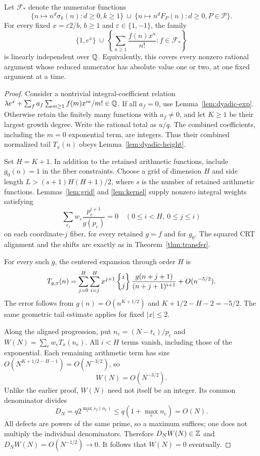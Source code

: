 \begin{theorem}
\label{thm:dyadic}
Let $\mathcal F_*$ denote the numerator functions
\[
 \{n\mapsto n^d\sigma_k(n):d\geq0,k\geq1\}
 \ \cup\
 \{n\mapsto n^dF_P(n):d\geq0,P\in\mathcal P\}.
\]
For every fixed $x=\varepsilon 2/b$, $b\geq1$ and
$\varepsilon\in\{1,-1\}$, the family
\[
 \{1,e^x\}\ \cup\
 \left\{\sum_{n\geq1}\frac{f(n)x^n}{n!}:f\in\mathcal F_*\right\}
\]
is linearly independent over $\mathbb Q$.
Equivalently, this covers every nonzero rational argument whose
reduced numerator has absolute value one or two, at one fixed
argument at a time.
\end{theorem}
\begin{proof}
Consider a nontrivial integral-coefficient relation
$\lambda e^x+\sum_f a_f\sum_{m\geq1}f(m)x^m/m!\in\mathbb Q$.
If all $a_f=0$, use Lemma~\ref{lem:dyadic-exp}. Otherwise retain
the finitely many functions with $a_f\ne0$, and let $K\geq1$ be
their largest growth degree. Write the rational total as $u/q$.
The combined coefficients, including the $m=0$ exponential term,
are integers. Thus their combined normalized tail $T_x(n)$ obeys
Lemma~\ref{lem:dyadic-height}.

Set $H=K+1$. In addition to the retained arithmetic functions,
include $g_0(n)=1$ in the fiber constraints. Choose a grid of dimension
$H$ and side length $L>(s+1)H(H+1)/2$, where $s$ is the number
of retained arithmetic functions. Lemmas~\ref{lem:grid} and
\ref{lem:kernel} supply nonzero integral weights satisfying
\[
 \sum_{e_j}w_e\frac{p_e^{i+1}}{g(p_e)}=0
 \quad (0\leq i<H,\ 0\leq j\leq i)
\]
on each coordinate-$j$ fiber, for every retained $g=f$ and for $g_0$.
The squared CRT alignment and the shifts are exactly as in
Theorem~\ref{thm:transfer}.

For every such $g$, the centered expansion through order $H$ is
\begin{equation}\label{eq:dyadic-expansion}
 T_{g,x}(n)=\sum_{j=0}^H\sum_{i=j}^H
 x^{j+1}\left\{\begin{matrix}i\\j\end{matrix}\right\}\frac{g(n+j+1)}{(n+j+1)^{i+1}}
       +O(n^{-5/2}).
\end{equation}
The error follows from $g(n)=O(n^{K+1/2})$ and
$K+1/2-H-2=-5/2$. The same geometric tail estimate applies for
fixed $|x|\leq2$.

Along the aligned progression, put $n_e=(N-t_e)/p_e$ and
$W(N)=\sum_ew_eT_x(n_e)$. All $i<H$ terms vanish, including those
of the exponential. Each remaining arithmetic term has size
$O(N^{K+1/2-H-1})=O(N^{-3/2})$, so
\[
 W(N)=O(N^{-3/2}).
\]
Unlike the earlier proof, $W(N)$ need not itself be an integer.
Its common denominator divides
\[
 D_N=q2^{\max_e s_2(n_e)}
       \leq q(1+\max_e n_e)=O(N).
\]
All defects are powers of the same prime, so a maximum suffices;
one does not multiply the individual denominators. Therefore
$D_NW(N)\in\mathbb Z$ and $D_NW(N)=O(N^{-1/2})\to0$.
It follows that $W(N)=0$ eventually.


\end{proof}

